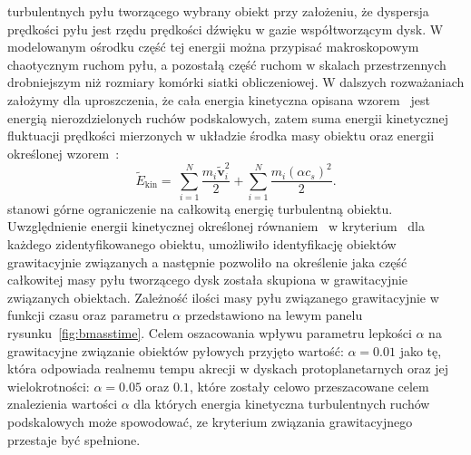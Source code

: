 turbulentnych pyłu tworzącego wybrany obiekt przy założeniu, że dyspersja
prędkości pyłu jest rzędu prędkości dźwięku w gazie współtworzącym dysk. W
modelowanym ośrodku część tej energii można przypisać makroskopowym chaotycznym
ruchom pyłu, a pozostałą część ruchom w skalach przestrzennych drobniejszym niż
rozmiary komórki siatki obliczeniowej. W dalszych rozważaniach założymy dla
uproszczenia, że cała energia kinetyczna opisana wzorem~ jest energią
nierozdzielonych ruchów podskalowych, zatem suma energii kinetycznej fluktuacji
prędkości mierzonych w układzie środka masy obiektu oraz energii określonej
wzorem~:
%
\begin{equation}
   \label{eq:ekin}
   \tilde{E}_{\textrm{kin}} = \
   \sum\limits_{i=1}^N \frac{m_i\tilde{\mathbf{v}}_i^2}{2}
   + \sum\limits_{i=1}^N \frac{m_i \left(\alpha c_s\right)^2}{2}.
\end{equation}
%
stanowi górne ograniczenie na całkowitą energię turbulentną obiektu.
Uwzględnienie energii kinetycznej określonej równaniem~\mref{eq:ekin} w
kryterium~\mref{eq:bcrit} dla każdego zidentyfikowanego obiektu, umożliwiło
identyfikację obiektów grawitacyjnie związanych a następnie pozwoliło na
określenie jaka część całkowitej masy pyłu tworzącego dysk
została skupiona w grawitacyjnie związanych
obiektach. Zależność ilości masy pyłu związanego grawitacyjnie w funkcji czasu
oraz parametru $\alpha$ przedstawiono na lewym panelu
rysunku~\ref{fig:bmasstime}. Celem oszacowania wpływu parametru lepkości
$\alpha$ na grawitacyjne związanie obiektów pyłowych przyjęto wartość:
$\alpha=0.01$ jako tę, która odpowiada realnemu tempu akrecji w dyskach
protoplanetarnych oraz jej wielokrotności: $\alpha=0.05$ oraz $0.1$, które
zostały celowo przeszacowane celem znalezienia wartości $\alpha$ dla których
energia kinetyczna turbulentnych ruchów podskalowych może spowodować, ze
kryterium związania grawitacyjnego przestaje być spełnione.
%
